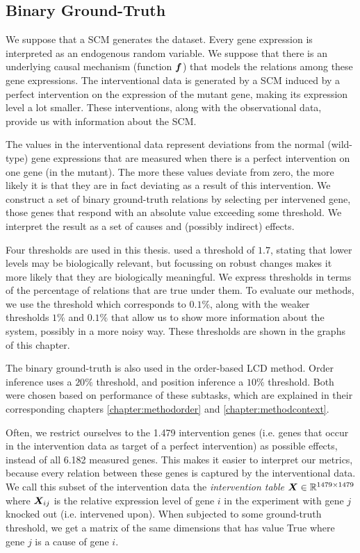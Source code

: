 \subsection{Binary Ground-Truth}
We suppose that a SCM generates the dataset. Every gene expression is interpreted as an endogenous random variable. We suppose that there is an underlying causal mechanism (function $\bm{f}$) that models the relations among these gene expressions. The interventional data is generated by a SCM induced by a perfect intervention on the expression of the mutant gene, making its expression level a lot smaller. These interventions, along with the observational data, provide us with information about the SCM. 

The values in the interventional data represent deviations from the normal (wild-type) gene expressions that are measured when there is a perfect intervention on one gene (in the mutant). The more these values deviate from zero, the more likely it is that they are in fact deviating as a result of this intervention. We construct a set of binary ground-truth relations by selecting per intervened gene, those genes that respond with an absolute value exceeding some threshold. We interpret the result as a set of causes and (possibly indirect) effects. 

Four thresholds are used in this thesis. \citet{kemmeren2014large} used a threshold of $1.7$, stating that lower levels may be biologically relevant, but focussing on robust changes makes it more likely that they are biologically meaningful. We express thresholds in terms of the percentage of relations that are true under them. To evaluate our methods, we use the \citet{kemmeren2014large} threshold which corresponds to $0.1\%$, along with the weaker thresholds $1\%$ and $0.1\%$ that allow us to show more information about the system, possibly in a more noisy way. These thresholds are shown in the graphs of this chapter.

The binary ground-truth is also used in the order-based LCD method. Order inference uses a $20\%$ threshold, and position inference a $10\%$ threshold. Both were chosen based on performance of these subtasks, which are explained in their corresponding chapters \ref{chapter:methodorder} and \ref{chapter:methodcontext}.


Often, we restrict ourselves to the 1.479 intervention genes (i.e. genes that occur in the intervention data as target of a perfect intervention) as possible effects, instead of all 6.182 measured genes. This makes it easier to interpret our metrics, because every relation between these genes is captured by the interventional data. We call this subset of the intervention data the \textit{intervention table} $\bm{X} \in \mathbb{R}^{1479\times 1479}$ where $\bm{X}_{ij}$ is the relative expression level of gene $i$ in the experiment with gene $j$ knocked out (i.e. intervened upon). When subjected to some ground-truth threshold, we get a matrix of the same dimensions that has value True where gene $j$ is a cause of gene $i$.

